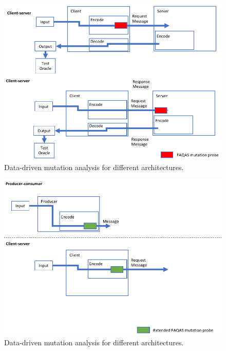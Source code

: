 \begin{figure}[h]
  \centering
    \includegraphics[width=14cm]{images/dataDrivenTestSuiteAugmentationE}
      \caption{Data-driven mutation analysis for different architectures.}
      \label{fig:dataDrivenTestSuiteAugmentationE}
\end{figure}

\begin{figure}[h]
  \centering
    \includegraphics[width=14cm]{images/dataDrivenTestSuiteAugmentationB}
      \caption{Data-driven mutation analysis for different architectures.}
      \label{fig:dataDrivenTestSuiteAugmentationB}
\end{figure}

\ENDCHANGEDFINAL



